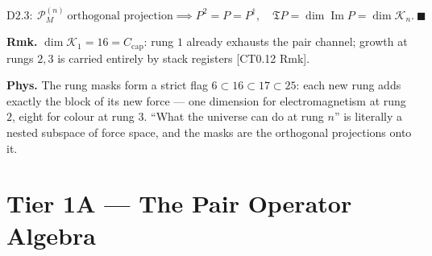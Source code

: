 \begin{theorem}
\[
\mathrm{D2.3}:\ \mathcal P_M^{(n)}\ \text{orthogonal projection}\implies P^2=P=P^\dagger,\quad\mathfrak T P=\dim\operatorname{Im}P=\dim\mathcal K_n.\ \blacksquare
\]

\textbf{Rmk.} $\dim\mathcal K_1=16=C_{\mathrm{cap}}$: rung $1$ already exhausts the pair channel; growth at rungs $2,3$ is carried entirely by stack registers [CT0.12 Rmk].

\textbf{Phys.} The rung masks form a strict flag $6\subset16\subset17\subset25$: each new rung adds exactly the block of its new force — one dimension for electromagnetism at rung $2$, eight for colour at rung $3$. “What the universe can do at rung $n$” is literally a nested subspace of force space, and the masks are the orthogonal projections onto it.

\end{theorem}

\section[Tier 1A — The Pair Operator Algebra]{\texorpdfstring{Tier 1A — The Pair Operator Algebra}{Tier 1A - The Pair Operator Algebra}}

